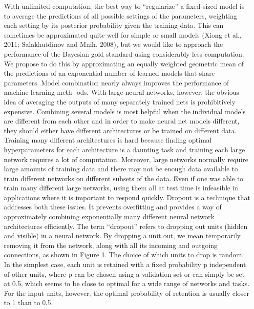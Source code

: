 With unlimited computation, the best way to “regularize” a fixed-sized model is to
average the predictions of all possible settings of the parameters, weighting each setting by
its posterior probability given the training data. This can sometimes be approximated quite
well for simple or small models (Xiong et al., 2011; Salakhutdinov and Mnih, 2008), but we
would like to approach the performance of the Bayesian gold standard using considerably
less computation. We propose to do this by approximating an equally weighted geometric
mean of the predictions of an exponential number of learned models that share parameters.
Model combination nearly always improves the performance of machine learning meth-
ods. With large neural networks, however, the obvious idea of averaging the outputs of
many separately trained nets is prohibitively expensive. Combining several models is most
helpful when the individual models are different from each other and in order to make
neural net models different, they should either have different architectures or be trained
on different data. Training many different architectures is hard because finding optimal
hyperparameters for each architecture is a daunting task and training each large network
requires a lot of computation. Moreover, large networks normally require large amounts of
training data and there may not be enough data available to train different networks on
different subsets of the data. Even if one was able to train many different large networks,
using them all at test time is infeasible in applications where it is important to respond
quickly.
Dropout is a technique that addresses both these issues. It prevents overfitting and
provides a way of approximately combining exponentially many different neural network
architectures efficiently. The term “dropout” refers to dropping out units (hidden and
visible) in a neural network. By dropping a unit out, we mean temporarily removing it from
the network, along with all its incoming and outgoing connections, as shown in Figure 1.
The choice of which units to drop is random. In the simplest case, each unit is retained with
a fixed probability p independent of other units, where p can be chosen using a validation
set or can simply be set at 0.5, which seems to be close to optimal for a wide range of
networks and tasks. For the input units, however, the optimal probability of retention is
usually closer to 1 than to 0.5.
